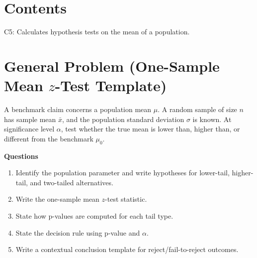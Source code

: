 \section*{Contents}
\setcounter{tocdepth}{2}
\setcounter{secnumdepth}{1}
\tableofcontents

\begin{ExamCriteria}
    \item C5: Calculates hypothesis tests on the mean of a population.
\end{ExamCriteria}

\section{General Problem (One-Sample Mean \texorpdfstring{\(z\)}{z}-Test Template)}
A benchmark claim concerns a population mean \(\mu\). A random sample of size \(n\) has sample mean \(\bar x\), and the population standard deviation \(\sigma\) is known. At significance level \(\alpha\), test whether the true mean is lower than, higher than, or different from the benchmark \(\mu_0\).

\textbf{Questions}
\begin{enumerate}
    \item[(a)] Identify the population parameter and write hypotheses for lower-tail, higher-tail, and two-tailed alternatives.
    \item[(b)] Write the one-sample mean \(z\)-test statistic.
    \item[(c)] State how p-values are computed for each tail type.
    \item[(d)] State the decision rule using p-value and \(\alpha\).
    \item[(e)] Write a contextual conclusion template for reject/fail-to-reject outcomes.
\end{enumerate}

